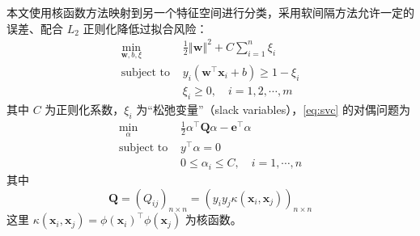 本文使用核函数方法映射到另一个特征空间进行分类，采用软间隔方法允许一定的误差、配合 $L_2$ 正则化降低过拟合风险\cite{sklearn}：
\begin{equation}\label{eq:svc}
	\begin{aligned}
		\min_{\textbf{w},b,\xi}\quad&\frac{1}{2}\left\Vert\textbf{w}\right\Vert^2 + C\sum_{i=1}^n \xi_i\\
		\text{subject to }& y_i(\mathbf{w}^\top\mathbf{x}_i+b)\geq 1-\xi_i\\
		&\xi_i\geq 0,\quad i=1,2,\cdots,m
	\end{aligned}
\end{equation}
其中 $C$ 为正则化系数，$\xi_i$ 为“松弛变量”（slack variables），\eqref{eq:svc} 的对偶问题为
\begin{equation}
	\begin{aligned}
		\min_{\alpha}\quad&\frac{1}{2}\alpha^\top \mathbf{Q}\alpha - \mathbf{e}^\top\alpha\\
		\text{subject to }& y^\top\alpha = 0 \\
		&0\leq \alpha_i\leq C,\quad i=1,\cdots,n
	\end{aligned}
\end{equation}
其中
\begin{equation}
	\mathbf{Q} = \left(Q_{ij}\right)_{n\times n} = \left(y_iy_j\kappa(\mathbf{x}_i,\mathbf{x}_j)\right)_{n\times n}
\end{equation}
这里 $\kappa(\mathbf{x}_i,\mathbf{x}_j)=\phi(\mathbf{x}_i)^\top\phi(\mathbf{x}_j)$ 为核函数。
%
%



